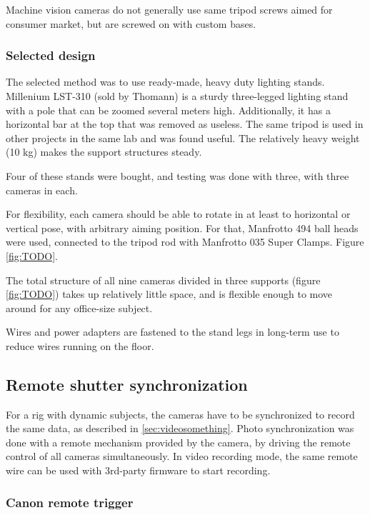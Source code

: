 Machine vision cameras do not generally use same tripod screws aimed for consumer market, but are screwed on with custom bases.

\subsubsection{Selected design}

The selected method was to use ready-made, heavy duty lighting stands.
Millenium LST-310 (sold by Thomann) is a sturdy three-legged lighting stand with a pole that can be zoomed several meters high.
Additionally, it has a horizontal bar at the top that was removed as useless.
The same tripod is used in other projects in the same lab and was found useful.
The relatively heavy weight (10 kg) makes the support structures steady. %

Four of these stands were bought, and testing was done with three, with three cameras in each.

For flexibility, each camera should be able to rotate in at least to horizontal or vertical pose, with arbitrary aiming position.
For that, Manfrotto 494 ball heads were used, connected to the tripod rod with Manfrotto 035 Super Clamps. Figure \ref{fig:TODO}.

The total structure of all nine cameras divided in three supports (figure \ref{fig:TODO}) takes up relatively little space, and is flexible enough to move around for any office-size subject.

Wires and power adapters are fastened to the stand legs in long-term use to reduce wires running on the floor.


\subsection{Remote shutter synchronization} %

For a rig with dynamic subjects, the cameras have to be synchronized to record the same data, as described in \ref{sec:videosomething}.
Photo synchronization was done with a remote mechanism provided by the camera, by driving the remote control of all cameras simultaneously.
In video recording mode, the same remote wire can be used with 3rd-party firmware to start recording.


\subsubsection{Canon remote trigger} %

